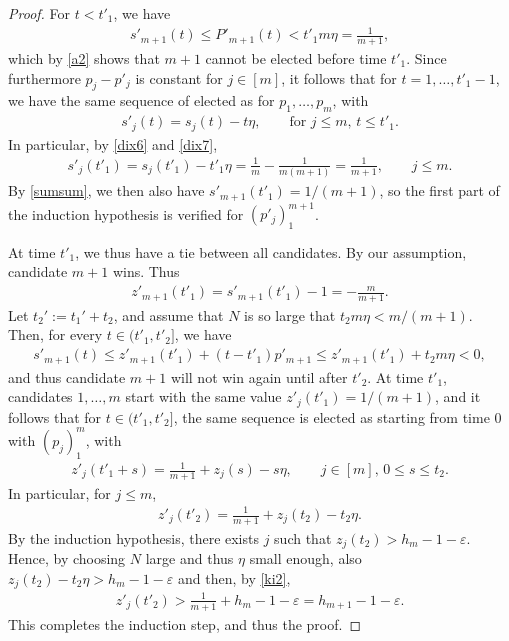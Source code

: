 \documentclass[11pt,reqno,tbtags,a4paper]{amsart}
\numberwithin{equation}{section}
\renewcommand\le{\leq}
\renewcommand\leq{\leqslant}
\theoremstyle{plain}%
\theoremstyle{definition}
\theoremstyle{remark}
\newcommand\eps{\varepsilon}
\newcommand\0{{\boldsymbol 0}}
\newcommand\1{{\boldsymbol 1}}
\begin{document}
\begin{proof}
For $t<t'_1$, we have
\begin{align}\label{dix9}
s'_{m+1}(t)\le P'_{m+1}(t) < t'_1m\eta =\frac{1}{m+1},             
\end{align}
which by \eqref{a2} shows that $m+1$ cannot be elected before time $t'_1$.
Since furthermore $p_j-p'_j$ is constant for $j\in[m]$,
it follows that for $t=1,\dots,t'_1-1$, we have the same sequence of elected
as for $p_1,\dots,p_m$, with
\begin{align}\label{dix10}
  s'_j(t)=s_j(t)-t\eta,
%
%
\qquad \text{for } j\le m,\,  t\le t'_1.
\end{align}
In particular, by \eqref{dix6} and \eqref{dix7},
\begin{align}\label{dix11}
  s'_j(t'_1)=s_j(t'_1)-t'_1\eta=\frac{1}{m}-\frac{1}{m(m+1)}=\frac{1}{m+1},
\qquad j\le m.
\end{align}
By \eqref{sumsum}, we then also have $s'_{m+1}(t'_1)=1/(m+1)$,
so the first part of the induction hypothesis is verified for $(p'_j)_1^{m+1}$.

At time $t'_1$, we thus have a tie between all candidates.
By our assumption,  candidate $m+1$ wins. Thus
\begin{align}
  z'_{m+1}(t'_1)=s'_{m+1}(t'_1)-1=-\frac{m}{m+1}.
\end{align}
Let $t_2':=t_1'+t_2$, and assume that $N$ is so large that
$t_2m\eta<m/(m+1)$. Then, for every $t\in(t'_1,t'_2]$, we have 
\begin{align}
s'_{m+1}(t) \le z'_{m+1}(t'_1)+(t-t'_1)p'_{m+1} 
%
\le  z'_{m+1}(t'_1)+t_2m\eta 
<0,
\end{align}
and thus candidate $m+1$ will not win again until after $t'_2$.
At time $t'_1$, candidates $1,\dots,m$ start with the same value
$z'_j(t'_1)=1/(m+1)$, and it follows that for $t\in(t'_1,t'_2]$,
the same sequence is elected as starting from time 0 with $(p_j)_1^m$,
with
\begin{align}\label{ki1}
  z'_j(t'_1+s)=\frac{1}{m+1}+z_j(s)-s\eta,
\qquad j\in[m],\, 0\le s\le t_2.
\end{align}
In particular, for $j\le m$,
\begin{align}\label{ki2}
  z'_j(t'_2)=\frac{1}{m+1}+z_j(t_2)-t_2\eta.
\end{align}
By the induction hypothesis, there exists $j$ such that
$z_j(t_2)>h_m-1-\eps$. Hence, by choosing $N$
large and thus $\eta$ small enough,
also
$z_j(t_2)-t_2\eta>h_m-1-\eps$ and then, by \eqref{ki2},
\begin{align}\label{ki3}
  z'_j(t'_2)>\frac{1}{m+1}+h_m-1-\eps=h_{m+1}-1-\eps.
\end{align}
This completes the induction step, and thus the proof.
\end{proof}
\end{document}

